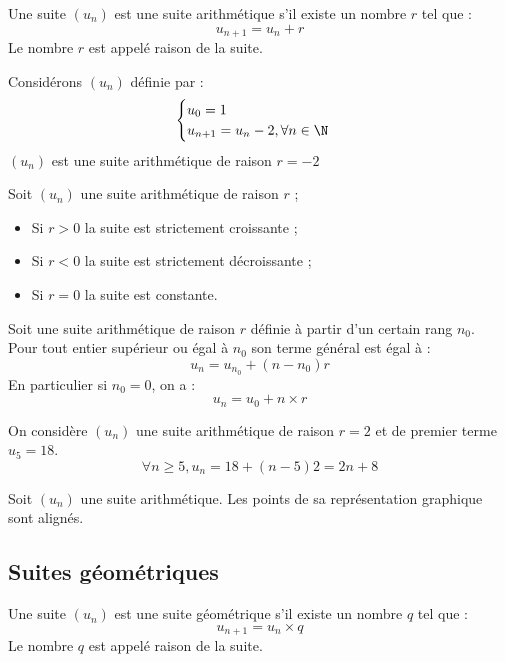 \documentclass[11pt]{article}
\begin{document}
\begin{definition}
Une suite $(u_n)$ est une suite arithmétique s'il existe un nombre $r$
tel que :
\[ u_{n+1} = u_n + r \]
Le nombre $r$ est appelé raison de la suite.
\end{definition}

\begin{exemple}
Considérons $(u_n)$ définie par :
\[ \begin{cases}
u_0 = 1 \\
u_{n+1} = u_n - 2, \forall n
\in \N
\end{cases} \]
$(u_n)$ est une suite arithmétique de raison $r=-2$
\end{exemple}

\begin{propriete}
Soit $(u_n)$ une suite arithmétique de raison $r$ ;
\begin{itemize}
\item Si $r > 0$ la suite est strictement croissante ;
\item Si $r < 0$ la suite est strictement décroissante ;
\item Si $r = 0$ la suite est constante.
\end{itemize}
\end{propriete}


\begin{theoreme}
Soit une suite arithmétique de raison $r$ définie à partir d'un
certain rang $n_0$.\\
Pour tout entier supérieur ou égal à $n_0$ son terme général est égal à :
\[ u_n = u_{n_0}+(n-n_0)r\]
En particulier si $n_0=0$, on a : 
\[ u_n = u_0 + n \times r\]
\end{theoreme}

\begin{exemple}
On considère $(u_n)$  une suite arithmétique de raison $r=2$ et de
premier terme $u_5=18$.
\[ \forall n \ge 5, u_n=18+(n-5)2 = 2n + 8\]
\end{exemple}

\begin{propriete}
Soit $(u_n)$ une suite arithmétique. Les points de sa représentation graphique sont alignés.
\end{propriete}

\subsection{Suites géométriques}

\begin{definition}
Une suite $(u_n)$ est une suite géométrique s'il existe un nombre $q$
tel que :
\[ u_{n+1} = u_n \times q \]
Le nombre $q$ est appelé raison de la suite.
\end{definition}
\end{document}
